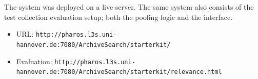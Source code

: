 The system was deployed on a live server. The same system also consists of the test collection evaluation setup; both the pooling logic and the interface.

\begin{itemize}
	\item URL: \texttt{http://pharos.l3s.uni-hannover.de:7080/ArchiveSearch/starterkit/}
	\item Evaluation: \texttt{http://pharos.l3s.uni-hannover.de:7080/ArchiveSearch/starterkit/relevance.html}
\end{itemize}

